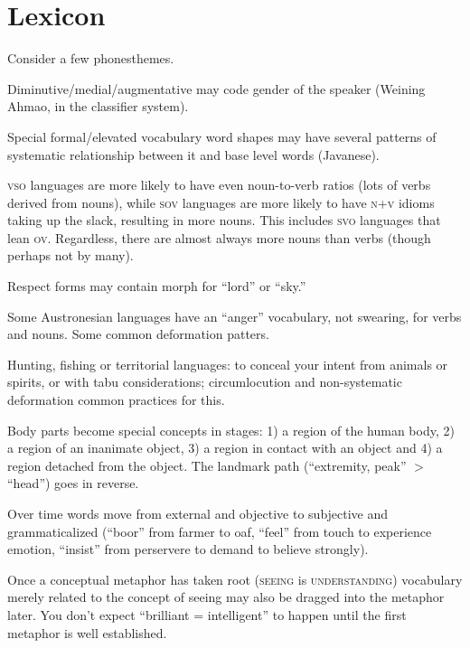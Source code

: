 \documentclass[11pt]{article}
\newcommand{\I}[1]{\textsc{#1}}   %
\begin{document}


\section{Lexicon}
Consider a few phonesthemes.

Diminutive/medial/augmentative may code gender of the speaker (Weining
Ahmao, in the classifier system).

Special formal/elevated vocabulary word shapes may have several
patterns of systematic relationship between it and base level words
(Javanese).

\I{vso} languages are more likely to have even noun-to-verb ratios
(lots of verbs derived from nouns), while \I{sov} languages are more
likely to have \I{n+v} idioms taking up the slack, resulting in more
nouns.  This includes \I{svo} languages that lean \I{ov}.  Regardless,
there are almost always more nouns than verbs (though perhaps not by
many).

Respect forms may contain morph for ``lord'' or ``sky.''

Some Austronesian languages have an ``anger'' vocabulary, not
swearing, for verbs and nouns.  Some common deformation patters.

Hunting, fishing or territorial languages: to conceal your intent from
animals or spirits, or with tabu considerations; circumlocution and
non-systematic deformation common practices for this.

Body parts become special concepts in stages: 1) a region of the human
body, 2) a region of an inanimate object, 3) a region in contact with
an object and 4) a region detached from the object.  The landmark path
(``extremity, peak'' $>$ ``head'') goes in reverse.

Over time words move from external and objective to subjective and
grammaticalized (``boor'' from farmer to oaf, ``feel'' from touch to
experience emotion, ``insist'' from perservere to demand to believe
strongly).

Once a conceptual metaphor has taken root (\I{seeing} is
\I{understanding}) vocabulary merely related to the concept of seeing
may also be dragged into the metaphor later.  You don't expect
``brilliant = intelligent'' to happen until the first metaphor is well
established.
\end{document}
